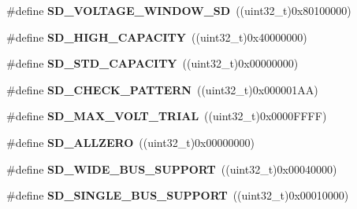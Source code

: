 \begin{DoxyCompactItemize}
\item 
\#define {\bfseries S\+D\+\_\+\+V\+O\+L\+T\+A\+G\+E\+\_\+\+W\+I\+N\+D\+O\+W\+\_\+\+SD}~((uint32\+\_\+t)0x80100000)\hypertarget{group__sd__card__private_ga0c04dbb0a43806365bea64893961079e}{}\label{group__sd__card__private_ga0c04dbb0a43806365bea64893961079e}

\item 
\#define {\bfseries S\+D\+\_\+\+H\+I\+G\+H\+\_\+\+C\+A\+P\+A\+C\+I\+TY}~((uint32\+\_\+t)0x40000000)\hypertarget{group__sd__card__private_gad5a86eaeba6869b6b2139b92ddfb3a1f}{}\label{group__sd__card__private_gad5a86eaeba6869b6b2139b92ddfb3a1f}

\item 
\#define {\bfseries S\+D\+\_\+\+S\+T\+D\+\_\+\+C\+A\+P\+A\+C\+I\+TY}~((uint32\+\_\+t)0x00000000)\hypertarget{group__sd__card__private_ga3cb5fdbf46102857a99b044415873f14}{}\label{group__sd__card__private_ga3cb5fdbf46102857a99b044415873f14}

\item 
\#define {\bfseries S\+D\+\_\+\+C\+H\+E\+C\+K\+\_\+\+P\+A\+T\+T\+E\+RN}~((uint32\+\_\+t)0x000001\+A\+A)\hypertarget{group__sd__card__private_gac37389a0323f1a04aec2b59c905f0f6a}{}\label{group__sd__card__private_gac37389a0323f1a04aec2b59c905f0f6a}

\item 
\#define {\bfseries S\+D\+\_\+\+M\+A\+X\+\_\+\+V\+O\+L\+T\+\_\+\+T\+R\+I\+AL}~((uint32\+\_\+t)0x0000\+F\+F\+F\+F)\hypertarget{group__sd__card__private_ga8166660dfea1f2a865e30a8f86269b7f}{}\label{group__sd__card__private_ga8166660dfea1f2a865e30a8f86269b7f}

\item 
\#define {\bfseries S\+D\+\_\+\+A\+L\+L\+Z\+E\+RO}~((uint32\+\_\+t)0x00000000)\hypertarget{group__sd__card__private_gaa989d106109048a2fb453928325d1f7d}{}\label{group__sd__card__private_gaa989d106109048a2fb453928325d1f7d}

\item 
\#define {\bfseries S\+D\+\_\+\+W\+I\+D\+E\+\_\+\+B\+U\+S\+\_\+\+S\+U\+P\+P\+O\+RT}~((uint32\+\_\+t)0x00040000)\hypertarget{group__sd__card__private_ga6877313126588b7f2ce96f9b4d9a59b1}{}\label{group__sd__card__private_ga6877313126588b7f2ce96f9b4d9a59b1}

\item 
\#define {\bfseries S\+D\+\_\+\+S\+I\+N\+G\+L\+E\+\_\+\+B\+U\+S\+\_\+\+S\+U\+P\+P\+O\+RT}~((uint32\+\_\+t)0x00010000)\hypertarget{group__sd__card__private_gadfcb6043212373c69f3f740732f5d2b2}{}\label{group__sd__card__private_gadfcb6043212373c69f3f740732f5d2b2}


\end{DoxyCompactItemize}
